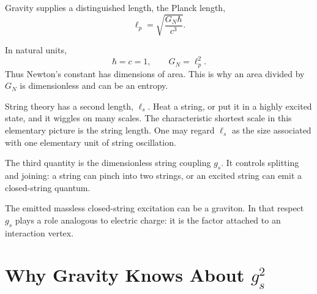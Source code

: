 Gravity supplies a distinguished length, the Planck length,
\begin{equation}
\ell_p=\sqrt{\frac{G_N\hbar}{c^3}}.
\label{eq:l06-planck-si}
\end{equation}

\begin{classroomqa}
\end{classroomqa}

In natural units,
\begin{equation}
\hbar=c=1,
\qquad
G_N=\ell_p^2.
\label{eq:l06-planck-area}
\end{equation}
Thus Newton's constant has dimensions of area. This is why an area divided by \(G_N\) is dimensionless and can be an entropy.

String theory has a second length, \(\ell_s\). Heat a string, or put it in a highly excited state, and it wiggles on many scales. The characteristic shortest scale in this elementary picture is the string length. One may regard \(\ell_s\) as the size associated with one elementary unit of string oscillation.

The third quantity is the dimensionless string coupling \(g_s\). It controls splitting and joining: a string can pinch into two strings, or an excited string can emit a closed-string quantum.

\begin{classroomqa}
\end{classroomqa}

The emitted massless closed-string excitation can be a graviton. In that respect \(g_s\) plays a role analogous to electric charge: it is the factor attached to an interaction vertex.

\section{Why Gravity Knows About \texorpdfstring{\(g_s^2\)}{the Coupling Squared}}

